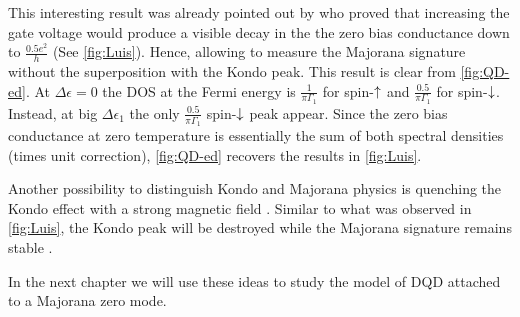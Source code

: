  This interesting result was already pointed out by  \citeauthor{ruiz-tijerina_interaction_2015}  
 who proved that increasing the gate voltage would produce a visible decay in the the zero bias conductance down to $\frac{0.5 e^2}{h}$ (See \ref{fig:Luis}). Hence, allowing to measure the Majorana signature without the superposition with the Kondo peak.  This result is clear from \ref{fig:QD-ed}. At $\Delta \epsilon = 0$ the DOS at the Fermi energy is $\frac{1}{\pi \Gamma_1}$ for spin-$\uparrow$ and $\frac{0.5}{\pi \Gamma_1}$ for spin-$\downarrow$. Instead, at big $\Delta \epsilon_1$ the only $\frac{0.5}{\pi \Gamma_1}$ spin-$\downarrow$ peak appear.  Since the zero bias conductance at zero temperature is essentially the sum of both spectral densities (times unit correction), \ref{fig:QD-ed} recovers the results in \ref{fig:Luis}. 

 


Another possibility to distinguish Kondo and Majorana physics is quenching the Kondo effect with a strong magnetic field . Similar to what was observed in \ref{fig:Luis}, the Kondo peak will be destroyed while the Majorana signature remains stable \cite{ruiz-tijerina_interaction_2015}. 

In the next chapter we will use these ideas to study the model of DQD attached to a Majorana zero mode.







